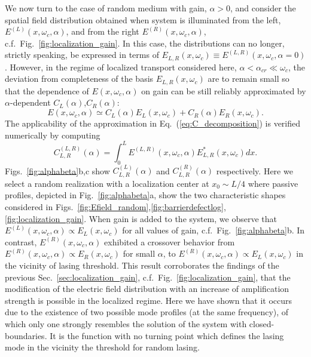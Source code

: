 We now turn to the case of random medium with gain, $\alpha>0$, and consider the spatial field distribution obtained when system is illuminated from the left, $E^{(L)}(x,\omega_c,\alpha)$, and from the right $E^{(R)}(x,\omega_c,\alpha)$, c.f.~Fig.~\ref{fig:localization_gain}. In this case, the distributions can no longer, strictly speaking, be expressed in terms of $E_{L,R}(x,\omega_c)\equiv  E^{(L,R)}(x,\omega_c,\alpha=0)$. However, in the regime of localized transport considered here, $\alpha<\alpha_{cr}\ll\omega_c$, the deviation from completeness of the basis $E_{L,R}(x,\omega_c)$ are to remain small so that  the dependence of $E(x,\omega_c,\alpha)$ on gain can be still reliably approximated by $\alpha$-dependent $C_{L}(\alpha)$,$C_{R}(\alpha)$:
\begin{equation}
E(x,\omega_c,\alpha)\simeq C_L(\alpha) E_{L}(x,\omega_c)+C_R(\alpha) E_{R}(x,\omega_c).
\label{eq:C_decomposition}
\end{equation}
The applicability of the approximation in Eq.~(\ref{eq:C_decomposition}) is verified numerically by computing  
\begin{equation}
C_{L,R}^{(L,R)}(\alpha)=\int_{0}^{L} E^{(L,R)}(x,\omega_c,\alpha)E_{L,R}^*(x,\omega_c)dx.
\label{eq:C_completeness}
\end{equation}
Figs.~\ref{fig:alphabeta}b,c show $C_{L,R}^{(L)}(\alpha)$ and $C_{L,R}^{(R)}(\alpha)$ respectively. Here we select a random realization with a localization center at $x_0\sim L/4$ where passive profiles, depicted in Fig.~\ref{fig:alphabeta}a, show the two characteristic shapes considered in Figs.~\ref{fig:Efield_random},\ref{fig:barrierdefectlog},\ref{fig:localization_gain}. When gain is added to the system, we observe that $E^{(L)}(x,\omega_c,\alpha)\propto E_{L}(x,\omega_c)$ for all values of gain, c.f.~Fig.~\ref{fig:alphabeta}b. In contrast, $E^{(R)}(x,\omega_c,\alpha)$ exhibited a crossover behavior from $E^{(R)}(x,\omega_c,\alpha)\propto E_{R}(x,\omega_c)$ for small $\alpha$, to $E^{(R)}(x,\omega_c,\alpha)\propto E_{L}(x,\omega_c)$ in the vicinity of lasing threshold. This result corroborates the findings of the previous Sec.~\ref{sec:localization_gain}, c.f.~Fig.~\ref{fig:localization_gain}, that the modification of the electric field distribution with an increase of amplification strength is possible in the localized regime. Here we have shown that it occurs due to the existence of two possible mode profiles (at the same frequency), of which only one strongly resembles the solution of the system with closed-boundaries. It is the function with no turning point which defines the lasing mode in the vicinity the threshold for random lasing. 

